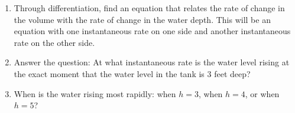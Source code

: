 \documentclass[11pt]{article}
\newcommand{\cuthere}{%
\noindent
\raisebox{-2.8pt}[0pt][0.75\baselineskip]{\small\ding{34}}
\unskip{\tiny\dotfill}
}
\begin{document}
\begin{enumerate}
	\vspace{0.5in}
	
	\item Through differentiation, find an equation that relates the rate of change in the volume with the rate of change in the water depth. This will be an equation with one instantaneous rate on one side and another instantaneous rate on the other side. 
	
	\vspace{1in}
	
	\item Answer the question: At what instantaneous rate is the water level rising at the exact moment that the water level in the tank is 3 feet deep? 
	
	\vspace{1in}
	
	\item When is the water rising most rapidly: when $h=3$, when $h = 4$, or when $h=5$? 

\end{enumerate}


% 
% 
% 
\end{document}
